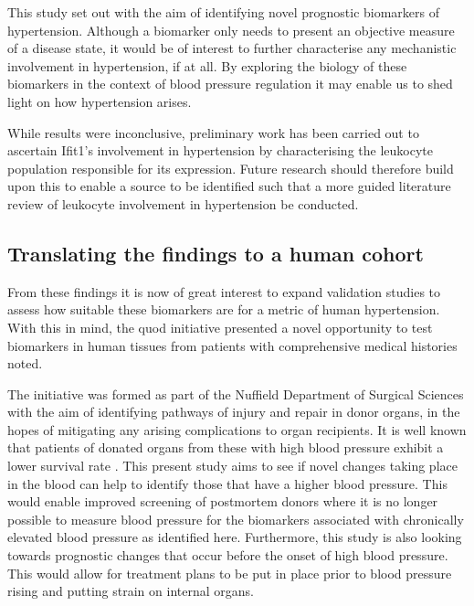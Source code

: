 This study set out with the aim of identifying novel prognostic biomarkers of hypertension. Although a biomarker only needs to present an objective measure of a disease state, it would be of interest to further characterise any mechanistic involvement in hypertension, if at all. By exploring the biology of these biomarkers in the context of blood pressure regulation it may enable us to shed light on how hypertension arises. 


While results were inconclusive, preliminary work has been carried out to ascertain Ifit1's involvement in hypertension by characterising the leukocyte population responsible for its expression. Future research should therefore build upon this to enable a source to be identified such that a more guided literature review of leukocyte involvement in hypertension be conducted. 

\subsection{Translating the findings to a human cohort}

From these findings it is now of great interest to expand validation studies to assess how suitable these biomarkers are for a metric of human hypertension. With this in mind, the \acrfull{quod} initiative presented a novel opportunity to test biomarkers in human tissues from patients with comprehensive medical histories noted. 

The initiative was formed as part of the Nuffield Department of Surgical Sciences with the aim of identifying pathways of injury and repair in donor organs, in the hopes of mitigating any arising complications to organ recipients. It is well known that patients of donated organs from these with high blood pressure exhibit a lower survival rate \cite{Hu2017}. This present study aims to see if novel changes taking place in the blood can help to identify those that have a higher blood pressure. This would enable improved screening of postmortem donors where it is no longer possible to measure blood pressure for the biomarkers associated with chronically elevated blood pressure as identified here. Furthermore, this study is also looking towards prognostic changes that occur before the onset of high blood pressure. This would allow for treatment plans to be put in place prior to blood pressure rising and putting strain on internal organs. 

